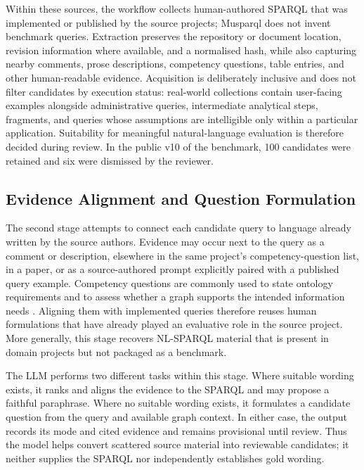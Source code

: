 Within these sources, the workflow collects human-authored SPARQL that was implemented or published by the source projects; Musparql does not invent benchmark queries. Extraction preserves the repository or document location, revision information where available, and a normalised hash, while also capturing nearby comments, prose descriptions, competency questions, table entries, and other human-readable evidence. Acquisition is deliberately inclusive and does not filter candidates by execution status: real-world collections contain user-facing examples alongside administrative queries, intermediate analytical steps, fragments, and queries whose assumptions are intelligible only within a particular application. Suitability for meaningful natural-language evaluation is therefore decided during review. In the public v10 of the benchmark, 100 candidates were retained and six were dismissed by the reviewer.

\subsection{Evidence Alignment and Question Formulation}\label{evidence-alignment-and-question-formulation}

The second stage attempts to connect each candidate query to language already written by the source authors. Evidence may occur next to the query as a comment or description, elsewhere in the same project's competency-question list, in a paper, or as a source-authored prompt explicitly paired with a published query example. Competency questions are commonly used to state ontology requirements and to assess whether a graph supports the intended information needs \citep{gruninger1995competency}. Aligning them with implemented queries therefore reuses human formulations that have already played an evaluative role in the source project. More generally, this stage recovers NL-SPARQL material that is present in domain projects but not packaged as a benchmark.

The LLM performs two different tasks within this stage. Where suitable wording exists, it ranks and aligns the evidence to the SPARQL and may propose a faithful paraphrase. Where no suitable wording exists, it formulates a candidate question from the query and available graph context. In either case, the output records its mode and cited evidence and remains provisional until review. Thus the model helps convert scattered source material into reviewable candidates; it neither supplies the SPARQL nor independently establishes gold wording.

